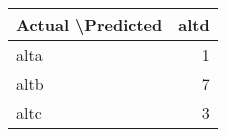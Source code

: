 \begin{tabular}{lr}
\toprule
Actual \textbackslash   Predicted &  altd \\
\midrule
               alta &     1 \\
               altb &     7 \\
               altc &     3 \\
\bottomrule
\end{tabular}
